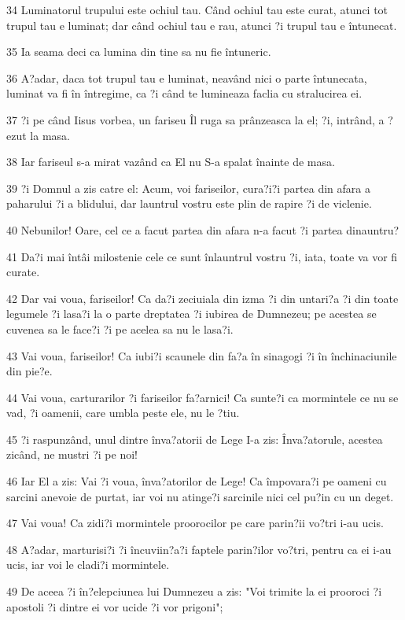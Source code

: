 \par 34 Luminatorul trupului este ochiul tau. Când ochiul tau este curat, atunci tot trupul tau e luminat; dar când ochiul tau e rau, atunci ?i trupul tau e întunecat.
\par 35 Ia seama deci ca lumina din tine sa nu fie întuneric.
\par 36 A?adar, daca tot trupul tau e luminat, neavând nici o parte întunecata, luminat va fi în întregime, ca ?i când te lumineaza faclia cu stralucirea ei.
\par 37 ?i pe când Iisus vorbea, un fariseu Îl ruga sa prânzeasca la el; ?i, intrând, a ?ezut la masa.
\par 38 Iar fariseul s-a mirat vazând ca El nu S-a spalat înainte de masa.
\par 39 ?i Domnul a zis catre el: Acum, voi fariseilor, cura?i?i partea din afara a paharului ?i a blidului, dar launtrul vostru este plin de rapire ?i de viclenie.
\par 40 Nebunilor! Oare, cel ce a facut partea din afara n-a facut ?i partea dinauntru?
\par 41 Da?i mai întâi milostenie cele ce sunt înlauntrul vostru ?i, iata, toate va vor fi curate.
\par 42 Dar vai voua, fariseilor! Ca da?i zeciuiala din izma ?i din untari?a ?i din toate legumele ?i lasa?i la o parte dreptatea ?i iubirea de Dumnezeu; pe acestea se cuvenea sa le face?i ?i pe acelea sa nu le lasa?i.
\par 43 Vai voua, fariseilor! Ca iubi?i scaunele din fa?a în sinagogi ?i în închinaciunile din pie?e.
\par 44 Vai voua, carturarilor ?i fariseilor fa?arnici! Ca sunte?i ca mormintele ce nu se vad, ?i oamenii, care umbla peste ele, nu le ?tiu.
\par 45 ?i raspunzând, unul dintre înva?atorii de Lege I-a zis: Înva?atorule, acestea zicând, ne mustri ?i pe noi!
\par 46 Iar El a zis: Vai ?i voua, înva?atorilor de Lege! Ca împovara?i pe oameni cu sarcini anevoie de purtat, iar voi nu atinge?i sarcinile nici cel pu?in cu un deget.
\par 47 Vai voua! Ca zidi?i mormintele proorocilor pe care parin?ii vo?tri i-au ucis.
\par 48 A?adar, marturisi?i ?i încuviin?a?i faptele parin?ilor vo?tri, pentru ca ei i-au ucis, iar voi le cladi?i mormintele.
\par 49 De aceea ?i în?elepciunea lui Dumnezeu a zis: "Voi trimite la ei prooroci ?i apostoli ?i dintre ei vor ucide ?i vor prigoni";
